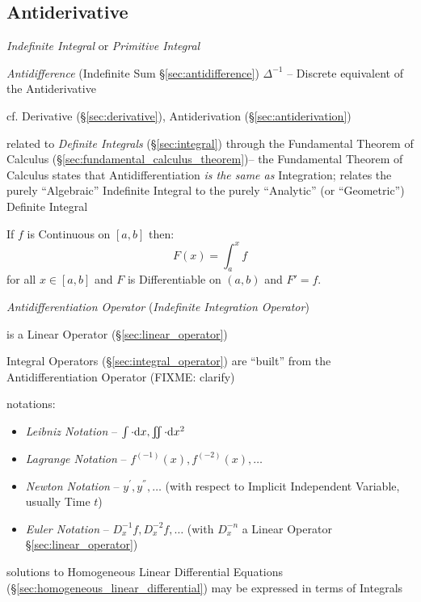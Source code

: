 {\subsection{Antiderivative}\label{sec:antiderivative}

\emph{Indefinite Integral} or \emph{Primitive Integral}

\fist \emph{Antidifference} (Indefinite Sum \S\ref{sec:antidifference})
$\Delta^{-1}$ -- Discrete equivalent of the Antiderivative

\fist cf. Derivative (\S\ref{sec:derivative}), Antiderivation
(\S\ref{sec:antiderivation})

\fist related to \emph{Definite Integrals} (\S\ref{sec:integral}) through the
Fundamental Theorem of Calculus (\S\ref{sec:fundamental_calculus_theorem})-- the
Fundamental Theorem of Calculus states that Antidifferentiation \emph{is the
  same as} Integration; relates the purely ``Algebraic'' Indefinite Integral
to the purely ``Analytic'' (or ``Geometric'') Definite Integral

If $f$ is Continuous on $[a,b]$ then:
\[
  F(x) = \int_a^x f
\]
for all $x \in [a,b]$ and $F$ is Differentiable on $(a,b)$ and $F' = f$.

\emph{Antidifferentiation Operator} (\emph{Indefinite Integration Operator})

is a Linear Operator (\S\ref{sec:linear_operator})

\fist Integral Operators (\S\ref{sec:integral_operator}) are ``built'' from the
Antidifferentiation Operator (FIXME: clarify)

notations:
\begin{itemize}
  \item \emph{Leibniz Notation} --
    $\int \cdot \mathrm{d}x, \iint \cdot \mathrm{d}x^2$
  \item \emph{Lagrange Notation} -- $f^{(-1)}(x), f^{(-2)}(x), \ldots$
  \item \emph{Newton Notation} -- $y^{'}, y^{''}, \ldots$ (with respect
    to Implicit Independent Variable, usually Time $t$)
  \item \emph{Euler Notation} -- $D^{-1}_x{f}, D^{-2}_x{f}, \ldots$ (with
    $D_x^{-n}$ a Linear  Operator \S\ref{sec:linear_operator})
\end{itemize}

solutions to Homogeneous Linear Differential Equations
(\S\ref{sec:homogeneous_linear_differential}) may be expressed in
terms of Integrals

}
